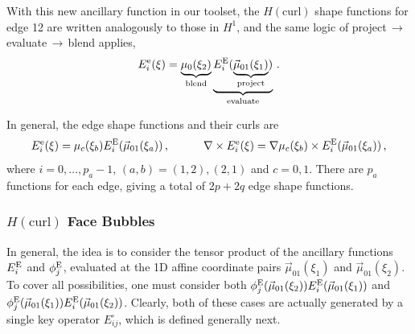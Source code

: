 With this new ancillary function in our toolset, the $H(\mathrm{curl})$ shape functions for edge 12 are written analogously to those in $H^1$, and the same logic of project$\,\to\,$evaluate$\,\to\,$blend applies,
\begin{equation*}
    E_i^\mathrm{e}(\xi)=\underbrace{\mu_0(\xi_2)}_{\text{blend}}
        \underbrace{E_i^{\mathrm{E}}(\underbrace{\vec{\mu}_{01}(\xi_1)}_{\text{project}})}_{\text{evaluate}}\,.
\end{equation*}

In general, the edge shape functions and their curls are
\begin{equation}
    E_i^\mathrm{e}(\xi)=\mu_c(\xi_b)E_i^{\mathrm{E}}(\vec{\mu}_{01}(\xi_a))\,,\qquad\quad
    \nabla\times E_i^\mathrm{e}(\xi)=\nabla\mu_c(\xi_b)\times E_i^{\mathrm{E}}(\vec{\mu}_{01}(\xi_a))\,,
    \label{eq:QuadHcurlEdge}
\end{equation}
where $i=0,\ldots,p_a-1$, $(a,b)=(1,2),(2,1)$ and $c=0,1$. There are $p_a$ functions for each edge, giving a total of $2p+2q$ edge shape functions.

\subsubsection{\texorpdfstring{$H(\mathrm{curl})$}{Hcurl} Face Bubbles}

In general, the idea is to consider the tensor product of the ancillary functions $E_i^{\mathrm{E}}$ and $\phi_j^{\mathrm{E}}$, evaluated at the 1D affine coordinate pairs $\vec{\mu}_{01}(\xi_1)$ and $\vec{\mu}_{01}(\xi_2)$. 
To cover all possibilities, one must consider both $\phi_j^{\mathrm{E}}(\vec{\mu}_{01}(\xi_2))E_i^{\mathrm{E}}(\vec{\mu}_{01}(\xi_1))$ and $\phi_j^{\mathrm{E}}(\vec{\mu}_{01}(\xi_1))E_i^{\mathrm{E}}(\vec{\mu}_{01}(\xi_2))$.
Clearly, both of these cases are actually generated by a single key operator $E_{ij}^\square$, which is defined generally next.

